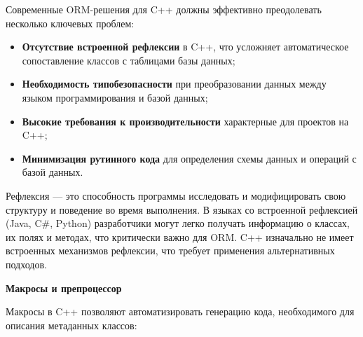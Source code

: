 
    
        Современные ORM-решения для C++ должны эффективно преодолевать несколько ключевых проблем:
        
        \begin{itemize}
            \item \textbf{Отсутствие встроенной рефлексии} в C++, что усложняет автоматическое сопоставление классов с таблицами базы данных;
            \item \textbf{Необходимость типобезопасности} при преобразовании данных между языком программирования и базой данных;
            \item \textbf{Высокие требования к производительности} характерные для проектов на C++;
            \item \textbf{Минимизация рутинного кода} для определения схемы данных и операций с базой данных.
        \end{itemize}
    

        Рефлексия — это способность программы исследовать и модифицировать свою структуру и поведение во время выполнения. В языках со встроенной рефлексией (Java, C\#, Python) разработчики могут легко получать информацию о классах, их полях и методах, что критически важно для ORM. C++ изначально не имеет встроенных механизмов рефлексии, что требует применения альтернативных подходов.

        \textbf{Макросы и препроцессор}
        
            Макросы в C++ позволяют автоматизировать генерацию кода, необходимого для описания метаданных классов:
            
